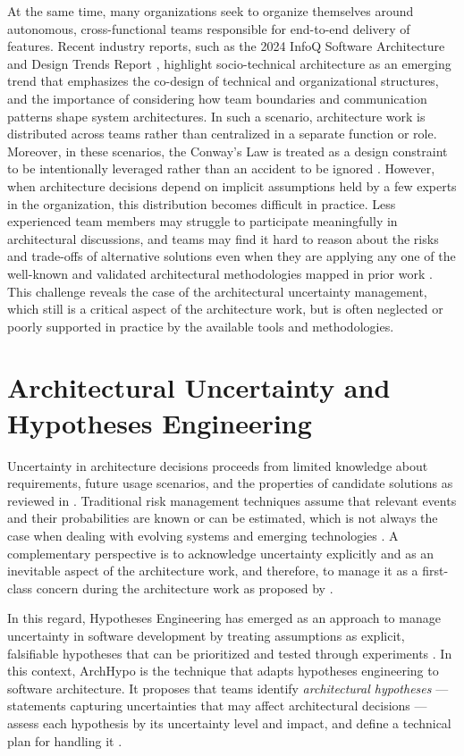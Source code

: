 At the same time, many organizations seek to organize themselves around autonomous, cross-functional teams responsible for end-to-end delivery of features. 
Recent industry reports, such as the 2024 InfoQ Software Architecture and Design Trends Report \citep{infoq2024trends}, highlight socio-technical architecture as an emerging trend that emphasizes the co-design of technical and organizational structures, and the importance of considering how team boundaries and communication patterns shape system architectures. 
In such a scenario, architecture work is distributed across teams rather than centralized in a separate function or role. Moreover, in these scenarios, the Conway's Law is treated as a design constraint to be intentionally leveraged rather than an accident to be ignored \citep{infoq2024trends}. 
However, when architecture decisions depend on implicit assumptions held by a few experts in the organization, this distribution becomes difficult in practice. Less experienced team members may struggle to participate meaningfully in architectural discussions, and teams may find it hard to reason about the risks and trade-offs of alternative solutions even when they are applying any one of the well-known and validated architectural methodologies mapped in prior work \citep{souza2019}.
This challenge reveals the case of the architectural uncertainty management, which still is a critical aspect of the architecture work, but is often neglected or poorly supported in practice by the available tools and methodologies.

\section{Architectural Uncertainty and Hypotheses Engineering}

Uncertainty in architecture decisions proceeds from limited knowledge about requirements, future usage scenarios, and the properties of candidate solutions as reviewed in \citet{silva2024tse}. 
Traditional risk management techniques assume that relevant events and their probabilities are known or can be estimated, which is not always the case when dealing with evolving systems and emerging technologies \citep{silva2024tse}. 
A complementary perspective is to acknowledge uncertainty explicitly and as an inevitable aspect of the architecture work, and therefore, to manage it as a first-class concern during the architecture work as proposed by \citet{silva2024tse}.

In this regard, Hypotheses Engineering has emerged as an approach to manage uncertainty in software development by treating assumptions as explicit, falsifiable hypotheses that can be prioritized and tested through experiments \citep{silva2024tse,silva2024ieeesw}. In this context, ArchHypo is the technique that adapts hypotheses engineering to software architecture. 
It proposes that teams identify \emph{architectural hypotheses} --- statements capturing uncertainties that may affect architectural decisions --- assess each hypothesis by its uncertainty level and impact, and define a technical plan for handling it \citep{silva2024tse}.

